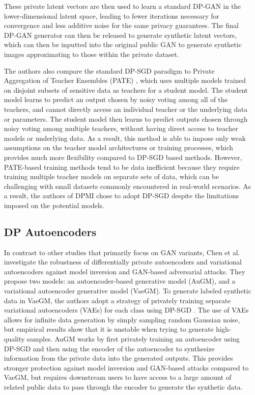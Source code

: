\documentclass{article}
\begin{document}
These private latent vectors are then used to learn a standard DP-GAN in the lower-dimensional latent space, leading to fewer iterations necessary for convergence and less additive noise for the same privacy guarantees. The final DP-GAN generator can then be released to generate synthetic latent vectors, which can then be inputted into the original public GAN to generate synthetic images approximating to those within the private dataset.

The authors also compare the standard DP-SGD paradigm to Private Aggregation of Teacher Ensembles (PATE) \cite{pate}, which uses multiple models trained on disjoint subsets of sensitive data as teachers for a student model. The student model learns to predict an output chosen by noisy voting among all of the teachers, and cannot directly access an individual teacher or the underlying data or parameters. The student model then learns to predict outputs chosen through noisy voting among multiple teachers, without having direct access to teacher models or underlying data. As a result, this method is able to impose only weak assumptions on the teacher model architectures or training processes, which provides much more flexibility compared to DP-SGD based methods. However, PATE-based training methods tend to be data inefficient because they require training multiple teacher models on separate sets of data, which can be challenging with small datasets commonly encountered in real-world scenarios. As a result, the authors of DPMI chose to adopt DP-SGD despite the limitations imposed on the potential models.



\subsection{DP Autoencoders}
In contrast to other studies that primarily focus on GAN variants, Chen et al. \cite{dp_gen} investigate the robustness of differentially private autoencoders and variational autoencoders \cite{vae} against model inversion and GAN-based adversarial attacks. They propose two models: an autoencoder-based generative model (AuGM), and a variational autoencoder generative model (VaeGM). To generate labeled synthetic data in VaeGM, the authors adopt a strategy of privately training separate variational autoencoders (VAEs) for each class using DP-SGD \cite{dpsgd}. The use of VAEs allows for infinite data generation by simply sampling random Gaussian noise, but empirical results show that it is unstable when trying to generate high-quality samples. AuGM works by first privately training an autoencoder using DP-SGD and then using the encoder of the autoencoder to synthesize information from the private data into the generated outputs. This provides stronger protection against model inversion and GAN-based attacks compared to VaeGM, but requires downstream users to have access to a large amount of related public data to pass through the encoder to generate the synthetic data.
\end{document}
